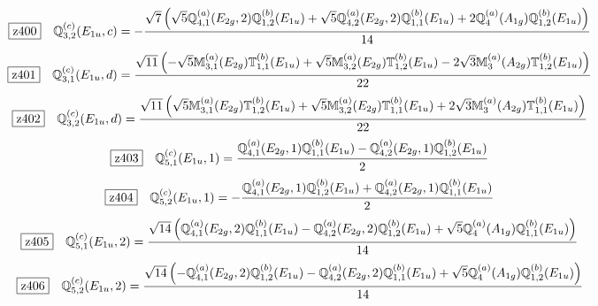 \documentclass[fleqn,10pt,landscape]{jsarticle}
\begin{document}
\begin{dmath*}
\hspace*{3mm}\fbox{z400}\quad \mathbb{Q}_{3,2}^{(c)}(E_{1u},c)=- \frac{\sqrt{7} \left(\sqrt{5} \mathbb{Q}_{4,1}^{(a)}(E_{2g},2) \mathbb{Q}_{1,2}^{(b)}(E_{1u}) + \sqrt{5} \mathbb{Q}_{4,2}^{(a)}(E_{2g},2) \mathbb{Q}_{1,1}^{(b)}(E_{1u}) + 2 \mathbb{Q}_{4}^{(a)}(A_{1g}) \mathbb{Q}_{1,2}^{(b)}(E_{1u})\right)}{14}
\end{dmath*}
\begin{dmath*}
\hspace*{3mm}\fbox{z401}\quad \mathbb{Q}_{3,1}^{(c)}(E_{1u},d)=\frac{\sqrt{11} \left(- \sqrt{5} \mathbb{M}_{3,1}^{(a)}(E_{2g}) \mathbb{T}_{1,1}^{(b)}(E_{1u}) + \sqrt{5} \mathbb{M}_{3,2}^{(a)}(E_{2g}) \mathbb{T}_{1,2}^{(b)}(E_{1u}) - 2 \sqrt{3} \mathbb{M}_{3}^{(a)}(A_{2g}) \mathbb{T}_{1,2}^{(b)}(E_{1u})\right)}{22}
\end{dmath*}
\begin{dmath*}
\hspace*{3mm}\fbox{z402}\quad \mathbb{Q}_{3,2}^{(c)}(E_{1u},d)=\frac{\sqrt{11} \left(\sqrt{5} \mathbb{M}_{3,1}^{(a)}(E_{2g}) \mathbb{T}_{1,2}^{(b)}(E_{1u}) + \sqrt{5} \mathbb{M}_{3,2}^{(a)}(E_{2g}) \mathbb{T}_{1,1}^{(b)}(E_{1u}) + 2 \sqrt{3} \mathbb{M}_{3}^{(a)}(A_{2g}) \mathbb{T}_{1,1}^{(b)}(E_{1u})\right)}{22}
\end{dmath*}
\begin{dmath*}
\hspace*{3mm}\fbox{z403}\quad \mathbb{Q}_{5,1}^{(c)}(E_{1u},1)=\frac{\mathbb{Q}_{4,1}^{(a)}(E_{2g},1) \mathbb{Q}_{1,1}^{(b)}(E_{1u}) - \mathbb{Q}_{4,2}^{(a)}(E_{2g},1) \mathbb{Q}_{1,2}^{(b)}(E_{1u})}{2}
\end{dmath*}
\begin{dmath*}
\hspace*{3mm}\fbox{z404}\quad \mathbb{Q}_{5,2}^{(c)}(E_{1u},1)=- \frac{\mathbb{Q}_{4,1}^{(a)}(E_{2g},1) \mathbb{Q}_{1,2}^{(b)}(E_{1u}) + \mathbb{Q}_{4,2}^{(a)}(E_{2g},1) \mathbb{Q}_{1,1}^{(b)}(E_{1u})}{2}
\end{dmath*}
\begin{dmath*}
\hspace*{3mm}\fbox{z405}\quad \mathbb{Q}_{5,1}^{(c)}(E_{1u},2)=\frac{\sqrt{14} \left(\mathbb{Q}_{4,1}^{(a)}(E_{2g},2) \mathbb{Q}_{1,1}^{(b)}(E_{1u}) - \mathbb{Q}_{4,2}^{(a)}(E_{2g},2) \mathbb{Q}_{1,2}^{(b)}(E_{1u}) + \sqrt{5} \mathbb{Q}_{4}^{(a)}(A_{1g}) \mathbb{Q}_{1,1}^{(b)}(E_{1u})\right)}{14}
\end{dmath*}
\begin{dmath*}
\hspace*{3mm}\fbox{z406}\quad \mathbb{Q}_{5,2}^{(c)}(E_{1u},2)=\frac{\sqrt{14} \left(- \mathbb{Q}_{4,1}^{(a)}(E_{2g},2) \mathbb{Q}_{1,2}^{(b)}(E_{1u}) - \mathbb{Q}_{4,2}^{(a)}(E_{2g},2) \mathbb{Q}_{1,1}^{(b)}(E_{1u}) + \sqrt{5} \mathbb{Q}_{4}^{(a)}(A_{1g}) \mathbb{Q}_{1,2}^{(b)}(E_{1u})\right)}{14}
\end{dmath*}
\end{document}
